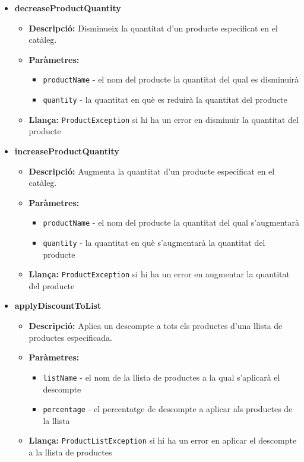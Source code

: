 \documentclass[a4paper, t]{article}
\begin{document}
\begin{itemize}
    \item \textbf{decreaseProductQuantity}
    \begin{itemize}
        \item \textbf{Descripció:} Disminueix la quantitat d'un producte especificat en el catàleg.
        \item \textbf{Paràmetres:}
        \begin{itemize}
            \item \texttt{productName} - el nom del producte la quantitat del qual es disminuirà
            \item \texttt{quantity} - la quantitat en què es reduirà la quantitat del producte
        \end{itemize}
        \item \textbf{Llança:} \texttt{ProductException} si hi ha un error en disminuir la quantitat del producte
    \end{itemize}

    \item \textbf{increaseProductQuantity}
    \begin{itemize}
        \item \textbf{Descripció:} Augmenta la quantitat d'un producte especificat en el catàleg.
        \item \textbf{Paràmetres:}
        \begin{itemize}
            \item \texttt{productName} - el nom del producte la quantitat del qual s'augmentarà
            \item \texttt{quantity} - la quantitat en què s'augmentarà la quantitat del producte
        \end{itemize}
        \item \textbf{Llança:} \texttt{ProductException} si hi ha un error en augmentar la quantitat del producte
    \end{itemize}

    \item \textbf{applyDiscountToList}
    \begin{itemize}
        \item \textbf{Descripció:} Aplica un descompte a tots els productes d'una llista de productes especificada.
        \item \textbf{Paràmetres:}
        \begin{itemize}
            \item \texttt{listName} - el nom de la llista de productes a la qual s'aplicarà el descompte
            \item \texttt{percentage} - el percentatge de descompte a aplicar als productes de la llista
        \end{itemize}
        \item \textbf{Llança:} \texttt{ProductListException} si hi ha un error en aplicar el descompte a la llista de productes
    \end{itemize}


\end{itemize}
\end{document}
